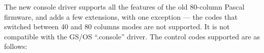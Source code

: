 \documentclass{report}
\begin{document}
\begin{comment}
\begin{htmlonly}
\begin{rawhtml}
<pre>
<b>Device
 Type			Use			slotNum
-------------------------------------------------------------------</b>
<b>0</b>	Used to be BASIC text drivers. These	Not Applicable
	are no longer supported under GNO/ME,
	and setting I/O to a BASIC driver
	actually selects a Pascal driver.

<b>1</b>	Pascal text driver. This is one of	Driver number as
	the drivers specified in /etc/ttys	listed above.
	or built-in to GNO/ME.

<b>2</b>	RAM-based Driver (documented in 	Pointer to the RAM-
	<em>ToolBox Reference Volume 2</em>.		based driver's jump
						table.

<b>3</b>	File redirection.			refNum (file desc-
						riptor) of the file
						to access through
						TextTools.
</pre>
\end{rawhtml}
\end{htmlonly}
%

\end{comment}


The new console driver supports all the
features of the old 80-column Pascal firmware, and adds a few
extensions, with one exception --- the codes that switched between
40 and 80 columns modes are not supported. It is not compatible
with the GS/OS 
``.console'' driver. The control codes supported are as follows:
\end{document}
